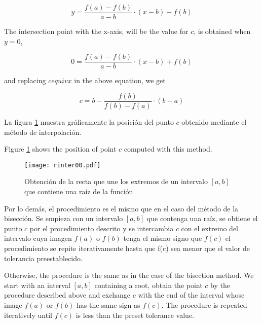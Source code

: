 \begin{paracol}{2}
\begin{equation*}
y=\frac{f(a)-f(b)}{a-b}\cdot(x-b)+f(b)
\end{equation*}

The intersection point with the x-axis, will be the value for $c$, is obtained when $y=0$,

\begin{equation*}
0=\frac{f(a)-f(b)}{a-b}\cdot(x-b)+f(b)
\end{equation*}

and replacing $cequiv x$ in the above equation, we get

\begin{equation*}
c=b-\frac{f(b)}{f(b)-f(a)}\cdot(b-a)
\end{equation*}

\switchcolumn
La figura \ref{fig:regulaf} muestra  gráficamente la posición del punto $c$ obtenido mediante el método de interpolación.

\switchcolumn
Figure \ref{fig:regulaf} shows the position of point $c$ computed with this method.
\end{paracol}

\begin{figure}[h]
\centering
\texttt{[image: rinter00.pdf]}

\caption{Obtención de la recta que une los extremos de un intervalo $[a,b]$  que contiene una raíz de la función}
\label{fig:regulaf}
\end{figure}

\begin{paracol}{2}
    Por lo demás, el procedimiento es el mismo que en el caso del método de la bisección. Se empieza con un intervalo $[a,b]$ que  contenga una raíz, se obtiene el punto $c$ por el procedimiento descrito y se intercambia $c$ con el extremo del intervalo cuya imagen $f(a)$ o $f(b)$ tenga el mismo signo que $f(c)$ el procedimiento se repite iterativamente hasta que f(c) sea menor que el valor de tolerancia preestablecido. 

    \switchcolumn
    Otherwise, the procedure is the same as in the case of the bisection method. We start with an interval $[a,b]$ containing a root, obtain the point $c$ by the procedure described above and exchange $c$ with the end of the interval whose image $f(a)$ or $f(b)$ has the same sign as $f(c)$. The procedure is repeated iteratively until $f(c)$ is less than the preset tolerance value. 
    
\end{paracol}



